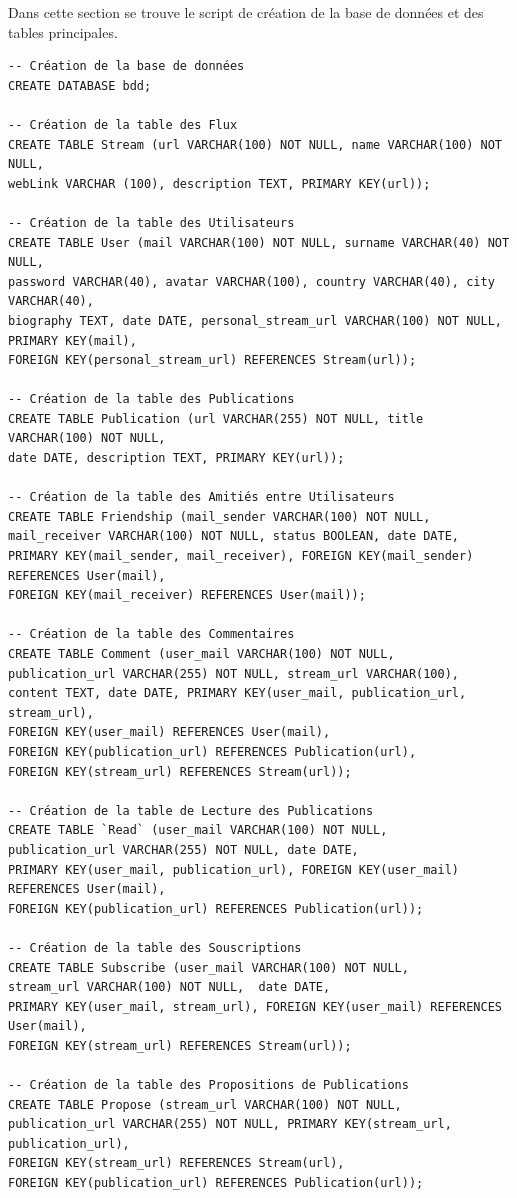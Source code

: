 \documentclass[a4paper,10pt]{article}
\begin{document}
Dans cette section se trouve le script de création de la base de données et des tables principales.

\begin{verbatim}
-- Création de la base de données
CREATE DATABASE bdd; 

-- Création de la table des Flux
CREATE TABLE Stream (url VARCHAR(100) NOT NULL, name VARCHAR(100) NOT NULL, 
webLink VARCHAR (100), description TEXT, PRIMARY KEY(url));

-- Création de la table des Utilisateurs
CREATE TABLE User (mail VARCHAR(100) NOT NULL, surname VARCHAR(40) NOT NULL, 
password VARCHAR(40), avatar VARCHAR(100), country VARCHAR(40), city VARCHAR(40), 
biography TEXT, date DATE, personal_stream_url VARCHAR(100) NOT NULL, PRIMARY KEY(mail), 
FOREIGN KEY(personal_stream_url) REFERENCES Stream(url));

-- Création de la table des Publications
CREATE TABLE Publication (url VARCHAR(255) NOT NULL, title VARCHAR(100) NOT NULL, 
date DATE, description TEXT, PRIMARY KEY(url));

-- Création de la table des Amitiés entre Utilisateurs
CREATE TABLE Friendship (mail_sender VARCHAR(100) NOT NULL, 
mail_receiver VARCHAR(100) NOT NULL, status BOOLEAN, date DATE, 
PRIMARY KEY(mail_sender, mail_receiver), FOREIGN KEY(mail_sender) REFERENCES User(mail), 
FOREIGN KEY(mail_receiver) REFERENCES User(mail));

-- Création de la table des Commentaires
CREATE TABLE Comment (user_mail VARCHAR(100) NOT NULL, 
publication_url VARCHAR(255) NOT NULL, stream_url VARCHAR(100), 
content TEXT, date DATE, PRIMARY KEY(user_mail, publication_url, stream_url), 
FOREIGN KEY(user_mail) REFERENCES User(mail), 
FOREIGN KEY(publication_url) REFERENCES Publication(url), 
FOREIGN KEY(stream_url) REFERENCES Stream(url));

-- Création de la table de Lecture des Publications
CREATE TABLE `Read` (user_mail VARCHAR(100) NOT NULL, 
publication_url VARCHAR(255) NOT NULL, date DATE, 
PRIMARY KEY(user_mail, publication_url), FOREIGN KEY(user_mail) REFERENCES User(mail), 
FOREIGN KEY(publication_url) REFERENCES Publication(url));

-- Création de la table des Souscriptions
CREATE TABLE Subscribe (user_mail VARCHAR(100) NOT NULL, 
stream_url VARCHAR(100) NOT NULL,  date DATE, 
PRIMARY KEY(user_mail, stream_url), FOREIGN KEY(user_mail) REFERENCES User(mail), 
FOREIGN KEY(stream_url) REFERENCES Stream(url));

-- Création de la table des Propositions de Publications
CREATE TABLE Propose (stream_url VARCHAR(100) NOT NULL, 
publication_url VARCHAR(255) NOT NULL, PRIMARY KEY(stream_url, publication_url), 
FOREIGN KEY(stream_url) REFERENCES Stream(url), 
FOREIGN KEY(publication_url) REFERENCES Publication(url));
\end{verbatim}
\end{document}
